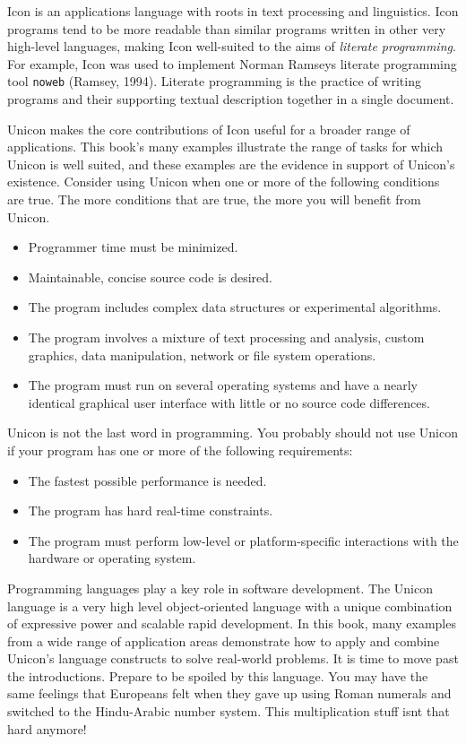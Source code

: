 Icon is an applications language with roots in text
processing and linguistics. Icon programs tend to be more readable than
similar programs written in other very high-level languages, making
Icon well-suited to the aims of \textit{literate programming}. For example, Icon was used
to implement Norman Ramsey{\textquotesingle}s literate
programming tool \texttt{noweb} (Ramsey, 1994). Literate programming is
the practice of writing programs and their supporting textual
description together in a single document.

Unicon makes the core contributions of Icon useful
for a broader range of applications. This book's many
examples illustrate the range of tasks for which Unicon is well
suited, and these examples are the evidence in
support of Unicon's existence.
Consider using Unicon when one or more of the following conditions are
true. The more conditions that are true, the more you will
benefit from Unicon.

\begin{itemize} \itemsep0pt
\item Programmer time must be minimized.
\item Maintainable, concise source code is desired.
\item The program includes complex data structures or experimental
algorithms.
\item The program involves a mixture of text processing and analysis, custom
graphics, data manipulation, network or file system operations.
\item The program must run on several operating systems and have a
nearly identical graphical user interface with little or no source code
differences.
\end{itemize}

Unicon is not the last word in programming. You probably should not use
Unicon if your program has one or more of the following requirements:

\begin{itemize} \itemsep0pt
\item The fastest possible performance is needed.
\item The program has hard real-time constraints.
\item The program must perform low-level or platform-specific
interactions with the hardware or operating system.
\end{itemize}

Programming languages play a key role in software development.
The Unicon language is a very high level
object-oriented language
with a unique combination of expressive power and scalable rapid
development. In this book, many examples from a wide range
of application areas demonstrate how to apply and combine Unicon's
language constructs to solve real-world problems.
It is time to move past the introductions. Prepare to be spoiled by
this language. You may have the same feelings that
Europeans felt when they gave up using Roman numerals and
switched to the Hindu-Arabic number system. {\textquotedbl}This
multiplication stuff isn{\textquotesingle}t that hard
anymore!{\textquotedbl} 
